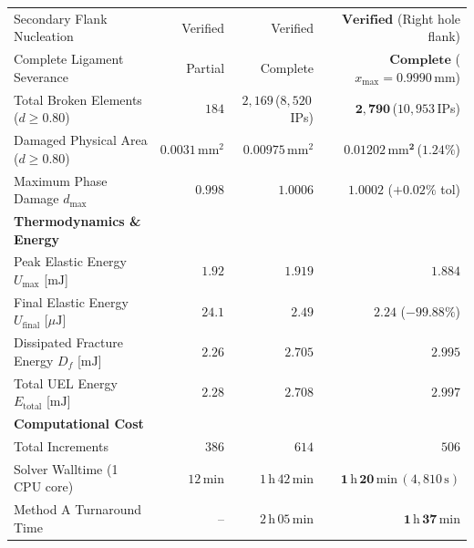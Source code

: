 \begin{table}[htbp]
\begin{tabularx}{\textwidth}{p{3.8cm}rrr}
Secondary Flank Nucleation & Verified & Verified & $\mathbf{Verified}$ (Right hole flank) \\
Complete Ligament Severance & Partial & Complete & $\mathbf{Complete}$ ($x_{\max} = 0.9990\,\mathrm{mm}$) \\
Total Broken Elements ($d \ge 0.80$) & $184$ & $2{,}169$\,($8{,}520$\,IPs) & $\mathbf{2{,}790}$\,($10{,}953$\,IPs) \\
Damaged Physical Area ($d \ge 0.80$) & $0.0031\,\mathrm{mm}^2$ & $0.00975\,\mathrm{mm}^2$ & $\mathbf{0.01202\,\mathrm{mm}^2}$\,($1.24\%$) \\
Maximum Phase Damage $d_{\max}$ & $0.998$ & $1.0006$ & $\mathbf{1.0002}$ ($+0.02\%$ tol) \\
\hline
\textbf{Thermodynamics \& Energy} & & & \\
Peak Elastic Energy $U_{\max}$ [$\mathrm{mJ}$] & $1.92$ & $1.919$ & $\mathbf{1.884}$ \\
Final Elastic Energy $U_{\mathrm{final}}$ [$\mu\mathrm{J}$] & $24.1$ & $2.49$ & $\mathbf{2.24}$ ($-99.88\%$) \\
Dissipated Fracture Energy $D_f$ [$\mathrm{mJ}$] & $2.26$ & $2.705$ & $\mathbf{2.995}$ \\
Total UEL Energy $E_{\mathrm{total}}$ [$\mathrm{mJ}$] & $2.28$ & $2.708$ & $\mathbf{2.997}$ \\
\hline
\textbf{Computational Cost} & & & \\
Total Increments & $386$ & $614$ & $506$ \\
Solver Walltime (1 CPU core) & $12\,\mathrm{min}$ & $1\,\mathrm{h}\,42\,\mathrm{min}$ & $\mathbf{1\,\mathrm{h}\,20\,\mathrm{min}}\,(4{,}810\,\mathrm{s})$ \\
Method A Turnaround Time & -- & $2\,\mathrm{h}\,05\,\mathrm{min}$ & $\mathbf{1\,\mathrm{h}\,37\,\mathrm{min}}$ \\
\hline
\end{tabularx}
\end{table}

